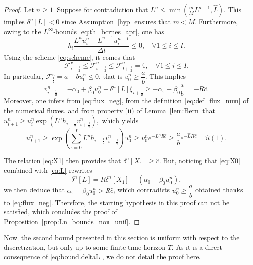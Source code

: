 \documentclass{amsart}
\newcommand\dt{\Delta t}
\newcommand\Fluxnum[1]{\mathcal{F}_{#1 \frac{1}{2}}^n}
\newcommand\h[1]{h_{#1 \frac{1}{2}}}
\renewcommand\v[2]{v_{#1 \frac{1}{2}}^{#2}}
\begin{document}
	\begin{proof}
		Let $n \geq 1$. Suppose for contradiction that $L^n \leq \min \left( \frac{m}{M} L^{n-1}, \hat{L} \right)$. This implies $\delta^n[L]< 0$ since Assumption~\eqref{hyp} 
		ensures that $m < M$. Furthermore,  owing to the $L^{\infty}$-bounds \eqref{eq:th_bornes_apr}, one has
		\begin{equation*}
			h_i \frac{L^n u_i^n - L^{n-1} u_i^{n-1}}{\dt} \leq 0, \quad \forall 1 \leq i \leq I.
		\end{equation*}
		Using the scheme \eqref{eq:scheme}, it comes that 
		\begin{equation} \label{eq:flux_neg}
			\Fluxnum{i-}\leq \Fluxnum{i+} \leq \Fluxnum{I+} = 0,\quad \forall 1\leq i\leq I.
		\end{equation}
		In particular, $\Fluxnum{} = a - b u_0^n \leq 0$, that is $u_0^n \geq \dfrac{a}{b}$. This implies
		\begin{equation}\label{eq:vi+1/2.estime}
			\v{i+}{n} = - \alpha_0 + \beta_0 u_0^n - \delta^n[L] \xi_{i+\frac{1}{2}} \geq  -\alpha_0 + \beta_0 \frac{a}b = - R \hat c.
		\end{equation}
		Moreover, one infers from \eqref{eq:flux_neg}, from the definition~\eqref{eq:def_flux_num} of the numerical fluxes, and from property (ii) of Lemma~\ref{lem:Bern} that 
		\(
		u_{i+1}^n \geq u_i^n \exp( L^n h_{i+\frac12} \v{i+}{n}), 
		\)
		which yields
		\begin{equation*}
		u_{I+1}^n\geq \exp{\left(\sum_{i=0}^{I}L^n \h{i+} \v{i+}{n}\right)} u_0^n \geq u_0^n e^{-L^n R \hat c} \geq \frac{a}{b} e^{- \hat{L} R \hat c} = \hat{u}(1). 
		\end{equation*}

		The relation \eqref{eq:X1} then provides that \(\delta^n[X_1] \geq \hat c\). But, noticing that \eqref{eq:X0} combined with \eqref{eq:L} rewrites 
		\begin{equation*}\label{eq:deltaL}
		 \delta^n[L]=R\delta^n[X_1]-(\alpha_0-\beta_0 u_0^n),   
		\end{equation*} 
		we then deduce that \(\alpha_0-\beta_0 u_0^n > R \hat c \), which contradicts $u_0^n \geq \dfrac{a}b$ obtained thanks to \eqref{eq:flux_neg}.
		Therefore, the starting hypothesis in this proof can not be satisfied, which concludes the proof of Proposition~\ref{prop:Ln_bounds_non_unif}. 
	\end{proof}
	Now, the second bound presented in this section is uniform with respect to the discretization, but only up to some finite time horizon $T$. As it is a direct consequence of \eqref{eq:bound.deltaL}, we do not detail the proof here.
\end{document}
